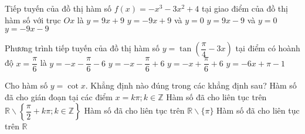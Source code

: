\begin{ex}%
Tiếp tuyến của đồ thị hàm số $f(x) = -x^3 - 3x^2 + 4$ tại giao điểm của đồ thị hàm số với trục $Ox$ là
\choice
{$y = 9x + 9$}
{\True $y = -9x + 9$ và $y = 0$}
{$y = 9x - 9$ và $y = 0$}
{$y = -9x - 9$}
\end{ex}

\begin{ex}%
	Phương trình tiếp tuyến của đồ thị hàm số $y = \tan \left(\dfrac{\pi}{4} - 3x \right) $ tại điểm có hoành độ $x = \dfrac{\pi}{6}$ là
	\choice
	{$y = -x - \dfrac{\pi}{6} - 6$}
	{$y = -x - \dfrac{\pi}{6} + 6$}
	{$y = -x + \dfrac{\pi}{6} + 6$}
	{\True $y = -6x + \pi - 1$}
\end{ex}

\begin{ex}%
Cho hàm số $y = \cot x$. Khẳng định nào đúng trong các khẳng định sau?
\choice
{\True Hàm số đã cho gián đoạn tại các điểm $x = k\pi; k \in \mathbb{Z}$}
{Hàm số đã cho liên tục trên $\mathbb{R} \backslash \left\lbrace \dfrac{\pi}{2} + k\pi; k \in \mathbb{Z} \right\rbrace $}
{Hàm số đã cho liên tục trên $\mathbb{R} \backslash \{\pi\}$}
{Hàm số đã cho liên tục trên $\mathbb{R}$}	
\end{ex}

